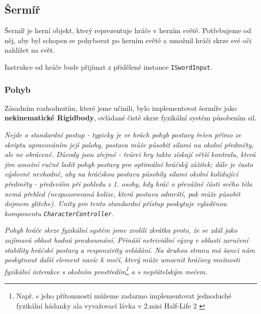 \pagebreak



\subsection{Šermíř}

Šermíř je herní objekt, který reprezentuje hráče v herním světě. Potřebujeme od něj, aby byl schopen se pohybovat po herním světě a umožnil hráči skrze své oči nahlížet na svět. 

Instrukce od hráče bude přijímat z přidělené instance \texttt{ISwordInput}.

\subsubsection*{Pohyb}

Zásadním rozhodnutím, které jsme učinili, bylo implementovat šermíře jako \textbf{nekinematické Rigidbody}, ovládané čistě skrze fyzikální systém působením sil. 

\textit{Nejde o standardní postup - typicky je ve hrách pohyb postavy řešen přímo ze skriptu upravováním její polohy, postava může působit silami na okolní předměty, ale ne obráceně. Důvody jsou zřejmé - tvůrci hry takto získají větší kontrolu, která jim umožní ručně ladit pohyb postavy pro optimální hráčský zážitek; dále je často výslovně nevhodné, aby na hráčskou postavu působily silami okolní kolidující předměty - především při pohledu z 1. osoby, kdy hráč o převážně části svého těla nemá přehled (nezpozorovaná kolize, která postavu odmrští, pak může působit dojmem glitche). Unity pro tento standardní přístup poskytuje vyladěnou komponentu \texttt{CharacterController}.}

\textit{Pohyb hráče skrze fyzikální systém jsme zvolili zkrátka proto, že se zdál jako zajímavá oblast hodná prozkoumání. Přináší netriviální výzvy v oblasti zaručení stability hráčské postavy a responzivity ovládání. Na druhou stranu má šanci nám poskytnout další element navíc k meči, který může umocnit hráčovy možnosti fyzikální interakce s okolním prostředím\footnote{Např. s jeho přítomností můžeme zadarmo implementovat jednoduché fyzikální hádanky ala vyvažovací lávka v 2.misi Half-Life 2 \cite{HalfLife2}} a s nepřátelským mečem.}

